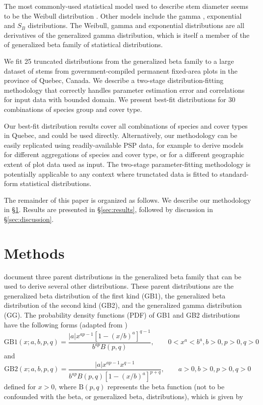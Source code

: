 \documentclass{article}
\begin{document}
The most commonly-used statistical model used to describe stem diameter seems to be the Weibull distribution \citep{bailey1973quantifying, liu2002finite, cao2004predicting, coomes2007mortality}. 
Other models include the gamma \citep{nelson1964diameter}, exponential \citep{meyer1943structure} and $S_B$ \citep{johnson1949systems} distributions.
The Weibull, gamma and exponential distributions are all derivatives of the generalized gamma distribution, which is itself a member of the of generalized beta family of statistical distributions.

We fit 25 truncated distributions from the generalized beta family to a large dataset of stems from government-compiled permanent fixed-area plots in the province of Quebec, Canada.
We describe a two-stage distribution-fitting methodology that correctly handles parameter estimation error and correlations for input data with bounded domain.
We present best-fit distributions for 30 combinations of species group and cover type.

Our best-fit distribution results cover all combinations of species and cover types in Quebec, and could be used directly.
Alternatively, our methodology can be easily replicated using readily-available PSP data, for example to derive models for different aggregations of species and cover type, or for a different geographic extent of plot data used as input.
The two-stage parameter-fitting methodology is potentially applicable to any context where trunctated data is fitted to standard-form statistical distributions.

The remainder of this paper is organized as follows.
We describe our methodology in \S\ref{sec:methods}. 
Results are presented in \S\ref{sec:results}, followed by discussion in \S\ref{sec:discussion}. %

\section{Methods}
\label{sec:methods}

\citet{ducey2015sizebiased} document three parent distributions in the generalized beta family that can be used to derive several other distributions.
These parent distributions are the generalized beta distribution of the first kind (GB1), the generalized beta distribution of the second kind (GB2), and the generalized gamma distribution (GG).
The probability density functions (PDF) of GB1 and GB2 distributions have the following forms (adapted from \citealp{ducey2015sizebiased})
\begin{equation}
\text{GB1}(x; a, b, p, q) = \frac{|a|x^{ap-1}\left[1 - (x/b)^a\right]^{q-1}}{b^{ap}B(p, q)}, \qquad 0 < x^a < b^a, b > 0, p > 0, q > 0
\end{equation}
and 
\begin{equation}
\text{GB2}(x; a, b, p, q) = \frac{|a|x^{ap-1}x^{q-1}}{b^{ap}B(p, q)\left[1 - (x/b)^a\right]^{p+q}}, \qquad a > 0, b > 0, p > 0, q > 0
\end{equation}
defined for $x > 0$, where $\text{B}(p, q)$ represents the beta function (not to be confounded with the beta, or generalized beta, distributions), which is given by
\end{document}
